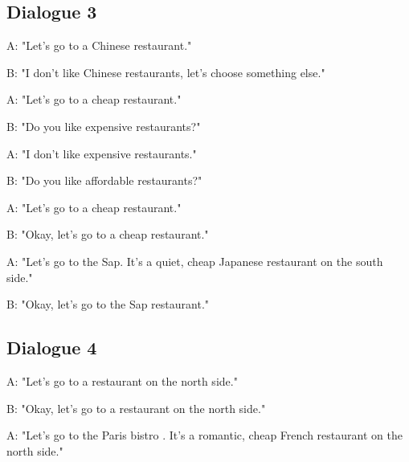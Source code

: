 \begin{appendix}
		
	\subsection{Dialogue 3}
	
		\begin{minipage}{\textwidth}
			{\ttfamily
				\begin{addmargin}[1em]{2em}%
					
					A: "Let's go to a Chinese restaurant."
					
					\hspace*{3mm}B: "I don't like Chinese restaurants, let's choose something else."
					
					A: "Let's go to a cheap restaurant."
					
					\hspace*{3mm}B: "Do you like expensive restaurants?"
					
					A: "I don't like expensive restaurants."
					
					\hspace*{3mm}B: "Do you like affordable restaurants?"
					
					A: "Let's go to a cheap restaurant."
					
					\hspace*{3mm}B: "Okay, let's go to a cheap restaurant."
					
					A: "Let's go to the Sap. It's a quiet, cheap Japanese restaurant on the south side."
					
					\hspace*{3mm}B: "Okay, let's go to the Sap restaurant."
					
					
				\end{addmargin}
			}
		\end{minipage}
		
	
	\subsection{Dialogue 4}
		
		\begin{minipage}{\textwidth}
			{\ttfamily
				\begin{addmargin}[1em]{2em}%
					A: "Let's go to a restaurant on the north side."
					
					\hspace*{3mm}B: "Okay, let's go to a restaurant on the north side."
					
					A: "Let's go to the Paris bistro . It's a romantic, cheap French restaurant on the north side."
					

\end{addmargin}}
\end{minipage}
\end{appendix}
